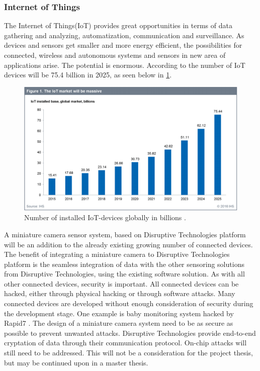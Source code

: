 \subsubsection{ Internet of Things}
The Internet of Things(IoT) \cite{IoT} provides great opportunities in terms of data gathering and analyzing, automatization, communication and surveillance. As devices and sensors get smaller and more energy efficient, the possibilities for connected, wireless and autonomous systems and sensors in new area of applications arise. The potential is enormous. According to \cite{IoT_devices} the number of IoT devices will be 75.4 billion in 2025, as seen below in \ref{fig:IoT_devices}.
\begin{figure}[H]
\centering
  \includegraphics[scale=0.5]{images/iot_number_of_devices.PNG}
  \caption{ Number of installed IoT-devices globally in billions \cite{IoT_devices}. } 
  \label{fig:IoT_devices}
\end{figure}

A miniature camera sensor system, based on Disruptive Technologies platform will be an addition to the already existing growing number of connected devices. The benefit of integrating a miniature camera to Disruptive Technologies platform is the seamless integration of data with the other sensoring solutions from Disruptive Technologies, using the existing software solution.  
As with all other connected devices, security is important. All connected devices can be hacked, either through physical hacking or through software attacks. Many connected devices are developed without enough consideration of security during the development stage. One example is baby monitoring system hacked by Rapid7 \cite{IoT_baby_monitoring}. 
The design of a miniature camera system need to be as secure as possible to prevent unwanted attacks. Disruptive Technologies provide end-to-end cryptation of data through their communication protocol. On-chip attacks will still need to be addressed. This will not be a consideration for the project thesis, but may be continued upon in a master thesis.

